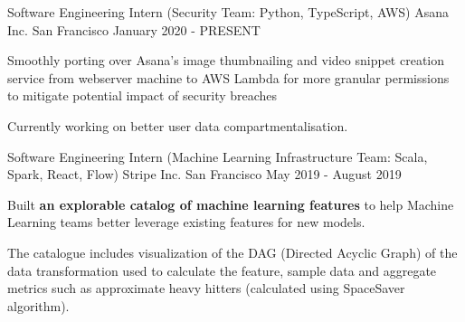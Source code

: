 

\begin{cventries}


  \cventry
  {Software Engineering Intern (Security Team: Python, TypeScript, AWS)} %
  {Asana Inc.} %
  {San Francisco} %
  {January 2020 - PRESENT} %
  {
    \begin{cvitems}
      \item {Smoothly porting over Asana's image thumbnailing and video snippet creation service from webserver machine to AWS Lambda for more granular permissions to mitigate potential impact of security breaches}
      \item {Currently working on better user data compartmentalisation.}
    \end{cvitems}
  }

  \cventry
  {Software Engineering Intern (Machine Learning Infrastructure Team: Scala, Spark, React, Flow)} %
  {Stripe Inc.} %
  {San Francisco} %
  {May 2019 - August 2019} %
  {
    \begin{cvitems}
      \item {Built \textbf{an explorable catalog of machine learning features} to help Machine Learning teams better leverage existing features for new models.}
      \item {The catalogue includes visualization of the DAG (Directed Acyclic Graph) of the data transformation used to calculate the feature, sample data and aggregate metrics such as approximate heavy hitters (calculated using SpaceSaver algorithm).}
    \end{cvitems}
  }


\end{cventries}
